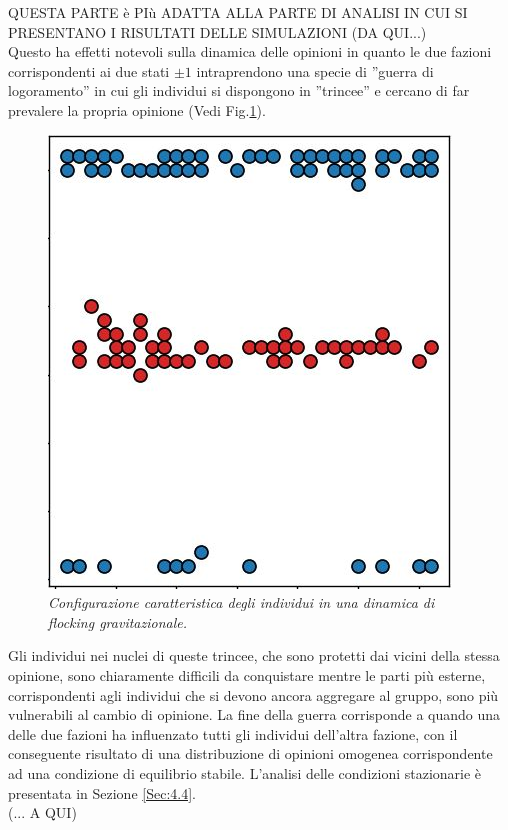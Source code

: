 \documentclass{article}
\begin{document}
QUESTA PARTE è PIù ADATTA ALLA PARTE DI ANALISI IN CUI SI PRESENTANO I RISULTATI DELLE SIMULAZIONI (DA QUI...)
\\Questo ha effetti notevoli sulla dinamica delle opinioni in quanto le due fazioni corrispondenti ai due stati $\pm1$ intraprendono una specie di ''guerra di logoramento'' in cui gli individui si dispongono in ''trincee'' e cercano di far prevalere la propria opinione (Vedi Fig.\ref{Fig:9}). 
\begin{figure}[h]
\centering
\includegraphics{trincea.jpg}
\caption{\textit{Configurazione caratteristica degli individui in una dinamica di flocking gravitazionale.}}
\label{Fig:9}

\end{figure}

Gli individui nei nuclei di queste trincee, che sono protetti dai vicini della stessa opinione, sono chiaramente difficili da conquistare mentre le parti più esterne, corrispondenti agli individui che si devono ancora aggregare al gruppo, sono più vulnerabili al cambio di opinione. La fine della guerra corrisponde a quando una delle due fazioni ha influenzato tutti gli individui dell'altra fazione, con il conseguente risultato di una distribuzione di opinioni omogenea corrispondente ad una condizione di equilibrio stabile. L'analisi delle condizioni stazionarie è presentata in Sezione \ref{Sec:4.4}.
\\ (... A QUI)
\end{document}
